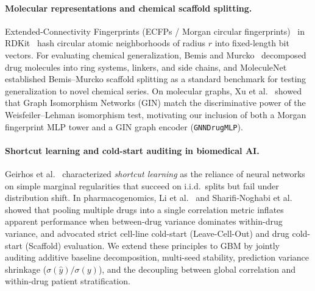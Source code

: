 \documentclass{article}
\begin{document}
\paragraph{Molecular representations and chemical scaffold splitting.}
Extended-Connectivity Fingerprints (ECFPs / Morgan circular fingerprints)~\cite{rogers2010ecfp} in RDKit~\cite{landrum2016rdkit} hash circular atomic neighborhoods of radius $r$ into fixed-length bit vectors. For evaluating chemical generalization, Bemis and Murcko~\cite{bemis1996properties} decomposed drug molecules into ring systems, linkers, and side chains, and MoleculeNet~\cite{wu2018moleculenet} established Bemis--Murcko scaffold splitting as a standard benchmark for testing generalization to novel chemical series. On molecular graphs, Xu et al.~\cite{xu2019powerful} showed that Graph Isomorphism Networks (GIN) match the discriminative power of the Weisfeiler--Lehman isomorphism test, motivating our inclusion of both a Morgan fingerprint MLP tower and a GIN graph encoder (\texttt{GNNDrugMLP}).

\paragraph{Shortcut learning and cold-start auditing in biomedical AI.}
Geirhos et al.~\cite{geirhos2020shortcut} characterized \emph{shortcut learning} as the reliance of neural networks on simple marginal regularities that succeed on i.i.d.\ splits but fail under distribution shift. In pharmacogenomics, Li et al.~\cite{li2021audit} and Sharifi-Noghabi et al.~\cite{sharifi2021out} showed that pooling multiple drugs into a single correlation metric inflates apparent performance when between-drug variance dominates within-drug variance, and advocated strict cell-line cold-start (Leave-Cell-Out) and drug cold-start (Scaffold) evaluation. We extend these principles to GBM by jointly auditing additive baseline decomposition, multi-seed stability, prediction variance shrinkage ($\sigma(\hat{y})/\sigma(y)$), and the decoupling between global correlation and within-drug patient stratification.
\end{document}
